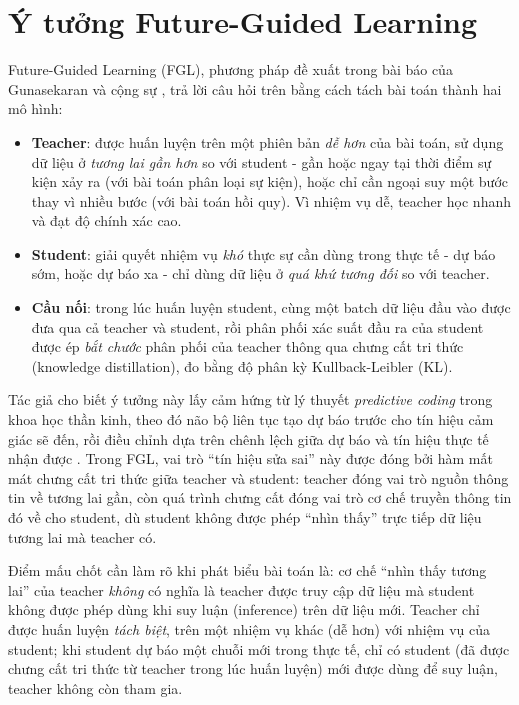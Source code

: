 \section{Ý tưởng Future-Guided Learning}

Future-Guided Learning (FGL), phương pháp đề xuất trong bài báo của Gunasekaran và cộng sự
\cite{gunasekaran2025fgl}, trả lời câu hỏi trên bằng cách tách bài toán thành hai mô hình:

\begin{itemize}
	\item \textbf{Teacher}: được huấn luyện trên một phiên bản \textit{dễ hơn} của bài toán,
	sử dụng dữ liệu ở \textit{tương lai gần hơn} so với student - gần hoặc ngay tại thời
	điểm sự kiện xảy ra (với bài toán phân loại sự kiện), hoặc chỉ cần ngoại suy một bước thay
	vì nhiều bước (với bài toán hồi quy). Vì nhiệm vụ dễ, teacher học nhanh và đạt độ chính xác
	cao.
	\item \textbf{Student}: giải quyết nhiệm vụ \textit{khó} thực sự cần dùng trong thực tế -
	dự báo sớm, hoặc dự báo xa - chỉ dùng dữ liệu ở \textit{quá khứ tương đối} so với teacher.
	\item \textbf{Cầu nối}: trong lúc huấn luyện student, cùng một batch dữ liệu đầu vào được
	đưa qua cả teacher và student, rồi phân phối xác suất đầu ra của student được ép
	\textit{bắt chước} phân phối của teacher thông qua chưng cất tri thức (knowledge
	distillation), đo bằng độ phân kỳ Kullback-Leibler (KL).
\end{itemize}

Tác giả cho biết ý tưởng này lấy cảm hứng từ lý thuyết \textit{predictive coding} trong khoa
học thần kinh, theo đó não bộ liên tục tạo dự báo trước cho tín hiệu cảm giác sẽ đến, rồi điều
chỉnh dựa trên chênh lệch giữa dự báo và tín hiệu thực tế nhận được \cite{raoballard1999predictive}.
Trong FGL, vai trò ``tín hiệu sửa sai'' này được đóng bởi hàm mất mát chưng cất tri thức giữa
teacher và student: teacher đóng vai trò nguồn thông tin về tương lai gần, còn quá trình chưng
cất đóng vai trò cơ chế truyền thông tin đó về cho student, dù student không được phép ``nhìn
thấy'' trực tiếp dữ liệu tương lai mà teacher có.

Điểm mấu chốt cần làm rõ khi phát biểu bài toán là: cơ chế ``nhìn thấy tương lai'' của teacher
\textit{không} có nghĩa là teacher được truy cập dữ liệu mà student không được phép dùng khi
suy luận (inference) trên dữ liệu mới. Teacher chỉ được huấn luyện \textit{tách biệt}, trên
một nhiệm vụ khác (dễ hơn) với nhiệm vụ của student; khi student dự báo một chuỗi mới trong
thực tế, chỉ có student (đã được chưng cất tri thức từ teacher trong lúc huấn luyện) mới được
dùng để suy luận, teacher không còn tham gia.

